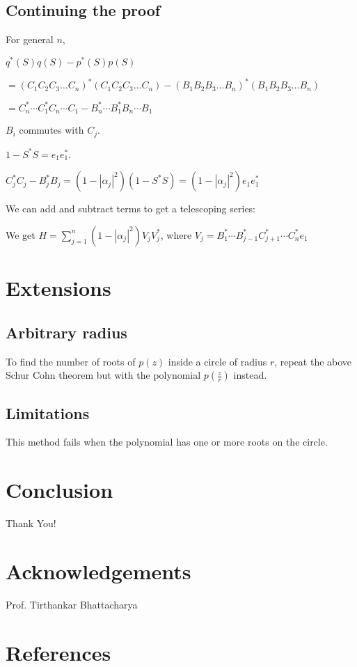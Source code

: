 \documentclass[twofold]{article}
\newcommand*\adj[1]{#1^*}
\newcommand*\abs[1]{\left \vert #1 \right\vert}
\theoremstyle{plain}
\theoremstyle{definition}
\theoremstyle{remark}
\begin{document}
\subsection{Continuing the proof}

For general \(n\), 

\(\adj{q}(S) q(S) - \adj{p}(S) p(S)\) 

\(= \adj{(C_1C_2C_3 \ldots C_n)}(C_1C_2C_3\ldots C_n) - \adj{(B_1B_2B_3\ldots B_n)} (B_1B_2B_3\ldots B_n)\)

\(= \adj{C_n} \cdots \adj{C_1} C_n \cdots C_1 - \adj{B_n} \cdots \adj{B_1} B_n \cdots B_1\)

\(B_i\) commutes with \(C_j\). 

\(1 - \adj{S} S = e_1 \adj{e_1}\). 

\(\adj{C_j} C_j - \adj{B_j} B_j = (1 - \abs{\alpha_j}^2) (1 - \adj{S} S) = (1 - \abs{\alpha_j}^2) e_1 \adj{e_1}\)

We can add and subtract terms to get a telescoping series:


We get \(H =\displaystyle \sum_{j=1} ^n (1-\abs{\alpha_j}^2) V_j \adj{V_j}\), where \(V_j = \adj{B_1} \cdots \adj{B_{j-1}} \adj{C_{j+1}} \cdots \adj{C_n} e_1\)
\section{Extensions}


\subsection{Arbitrary radius}
To find the number of roots of \(p(z)\) inside a circle of radius \(r\), repeat the above Schur Cohn theorem but with the polynomial \(p(\frac{z}{r})\) instead. 
\subsection{Limitations}
This method fails when the polynomial has one or more roots on the circle. 

\section{Conclusion}
Thank You!

\section{Acknowledgements}
Prof. Tirthankar Bhattacharya

\section{References}
\end{document}
